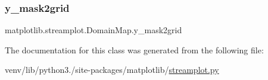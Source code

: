 \subsubsection{\texorpdfstring{y\+\_\+mask2grid}{y\_mask2grid}}
{\footnotesize\ttfamily matplotlib.\+streamplot.\+Domain\+Map.\+y\+\_\+mask2grid}



The documentation for this class was generated from the following file\+:\begin{DoxyCompactItemize}
\item 
venv/lib/python3./site-\/packages/matplotlib/\hyperlink{streamplot_8py}{streamplot.\+py}\end{DoxyCompactItemize}
